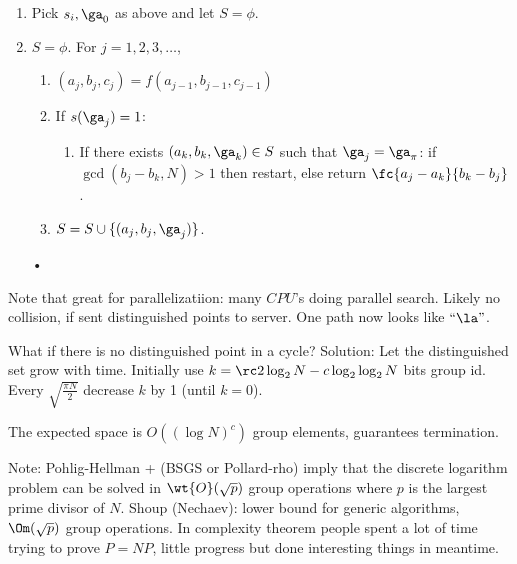 \begin{alg}
\begin{enumerate}
\item
Pick $s_i,\ga_0$ as above and let $S=\phi$. 
\item $S=\phi$. For $j=1, 2, 3,\ldots$, 
\begin{enumerate}
\item
$(a_j,b_j,c_j)=f(a_{j-1},b_{j-1},c_{j-1})$
\item
If $s(\ga_j)=1$:
\begin{enumerate}
\item
If there exists $(a_k,b_k,\ga_k)\in S$ such that $\ga_j=\ga_{\pi}$: if $\gcd(b_j-b_k,N)>1$ then restart, else return $\fc{a_j-a_k}{b_k-b_j}$.
\end{enumerate}
\item $S=S\cup \{(a_j,b_j,\ga_j)\}$.
\end{enumerate}•
\end{enumerate}
\end{alg}
Note that great for parallelizatiion: many $CPU$'s doing parallel search.
Likely no collision, if sent distinguished points to server. 
One path now looks like $``\la"$.

What if there is no distinguished point in a cycle? Solution: Let the distinguished set grow with time. Initially use $k=\rc 2\log_2N-c\log_2\log_2 N$ bits group id. Every $\sqrt{\frac{\pi N}{2}}$ decrease $k$ by 1 (until $k=0$). 

The expected space is $O((\log N)^c)$ group elements, guarantees termination.

Note: Pohlig-Hellman + (BSGS or Pollard-rho) imply that the discrete logarithm problem can be solved in $\wt{O}(\sqrt p)$ group operations where $p$ is the largest prime divisor of $N$. Shoup (Nechaev): lower bound for generic algorithms, $\Om(\sqrt p)$ group operations. In complexity theorem people spent a lot of time trying to prove $P=NP$, little progress but done interesting things in meantime. %


